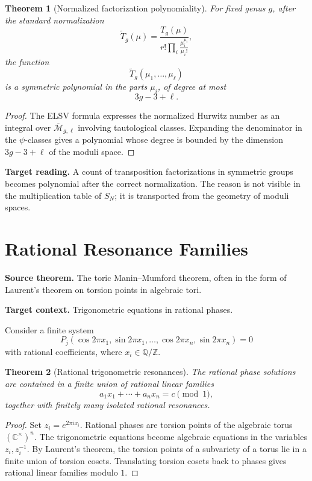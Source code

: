 \documentclass[11pt]{article}
\newtheorem{theorem}{Theorem}[section]
\begin{document}
\begin{theorem}[Normalized factorization polynomiality]
For fixed genus \(g\), after the standard normalization
\[
\widetilde T_g(\mu)
=
\frac{T_g(\mu)}
{r!\prod_i\frac{\mu_i^{\mu_i}}{\mu_i!}},
\]
the function
\[
\widetilde T_g(\mu_1,\ldots,\mu_\ell)
\]
is a symmetric polynomial in the parts \(\mu_i\), of degree at most
\[
3g-3+\ell.
\]
\end{theorem}

\begin{proof}
The ELSV formula expresses the normalized Hurwitz number as an integral over \(\overline{\mathcal M}_{g,\ell}\) involving tautological classes. Expanding the denominator in the \(\psi\)-classes gives a polynomial whose degree is bounded by the dimension \(3g-3+\ell\) of the moduli space.
\end{proof}

\textbf{Target reading.}
A count of transposition factorizations in symmetric groups becomes polynomial after the correct normalization. The reason is not visible in the multiplication table of \(S_N\); it is transported from the geometry of moduli spaces.

\section{Rational Resonance Families}

\textbf{Source theorem.}
The toric Manin--Mumford theorem, often in the form of Laurent's theorem on torsion points in algebraic tori.

\textbf{Target context.}
Trigonometric equations in rational phases.

Consider a finite system
\[
P_j(\cos 2\pi x_1,\sin 2\pi x_1,\ldots,\cos 2\pi x_n,\sin 2\pi x_n)=0
\]
with rational coefficients, where \(x_i\in\mathbb Q/\mathbb Z\).

\begin{theorem}[Rational trigonometric resonances]
The rational phase solutions are contained in a finite union of rational linear families
\[
a_1x_1+\cdots+a_nx_n=c\pmod 1,
\]
together with finitely many isolated rational resonances.
\end{theorem}

\begin{proof}
Set \(z_i=e^{2\pi i x_i}\). Rational phases are torsion points of the algebraic torus \((\mathbb C^\times)^n\). The trigonometric equations become algebraic equations in the variables \(z_i,z_i^{-1}\). By Laurent's theorem, the torsion points of a subvariety of a torus lie in a finite union of torsion cosets. Translating torsion cosets back to phases gives rational linear families modulo \(1\).
\end{proof}
\end{document}
